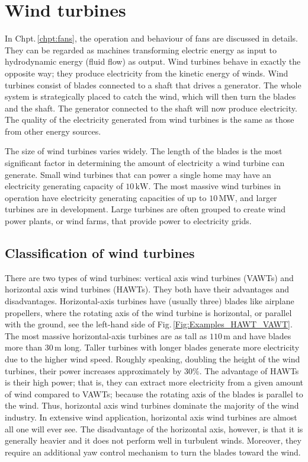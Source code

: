 \section{Wind turbines}

In Chpt.\,\ref{chpt:fans}, the operation and behaviour of fans are discussed in details. They can be regarded as machines transforming electric energy as input to hydrodynamic energy (fluid flow) as output. Wind turbines behave in exactly the opposite way; they produce electricity from the kinetic energy of winds. Wind turbines consist of blades connected to a shaft that drives a generator. The whole system is strategically placed to catch the wind, which will then turn the blades and the shaft. The generator connected to the shaft will now produce electricity. The quality of the electricity generated from wind turbines is the same as those from other energy sources.

The size of wind turbines varies widely. The length of the blades is the most significant factor in determining the amount of electricity a wind turbine can generate. Small wind turbines that can power a single home may have an electricity generating capacity of $10\,\mathrm{kW}$. The most massive wind turbines in operation have electricity generating capacities of up to $10\,\mathrm{MW}$, and larger turbines are in development. Large turbines are often grouped to create wind power plants, or wind farms, that provide power to electricity grids.

\subsection{Classification of wind turbines}
There are two types of wind turbines: vertical axis wind turbines (VAWTs) and horizontal axis wind turbines (HAWTs). They both have their advantages and disadvantages. Horizontal-axis turbines have (usually three) blades like airplane propellers, where the rotating axis of the wind turbine is horizontal, or parallel with the ground, see the left-hand side of Fig.\,\ref{Fig:Examples_HAWT_VAWT}. The most massive horizontal-axis turbines are as tall as $110\,\mathrm{m}$ and have blades more than $30\,\mathrm{m}$ long. Taller turbines with longer blades generate more electricity due to the higher wind speed. Roughly speaking, doubling the height of the wind turbines, their power increases approximately by $30\%$. The advantage of HAWTs is their high power; that is, they can extract more electricity from a given amount of wind compared to VAWTs; because the rotating axis of the blades is parallel to the wind. Thus, horizontal axis wind turbines dominate the majority of the wind industry. In extensive wind application, horizontal axis wind turbines are almost all one will ever see. The disadvantage of the horizontal axis, however, is that it is generally heavier and it does not perform well in turbulent winds. Moreover, they require an additional yaw control mechanism to turn the blades toward the wind.

